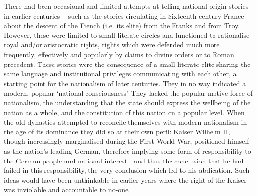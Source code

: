 There had been occasional and limited attempts at telling national origin stories in earlier centuries – such as the stories circulating in Sixteenth century France about the descent of the French (i.e. its elite) from the Franks and from Troy. However, these were limited to small literate circles and functioned to rationalise royal and/or aristocratic rights, rights which were defended much more frequently, effectively and popularly by claims to divine orders or to Roman precedent. These stories were the consequence of a small literate elite sharing the same language and institutional privileges communicating with each other, a starting point for the nationalism of later centuries. They in no way indicated a modern, popular ‘national consciousness’. They lacked the popular motive force of nationalism, the understanding that the state should express the wellbeing of the nation as a whole, and the constitution of this nation on a popular level. When the old dynasties attempted to reconcile themselves with modern nationalism in the age of its dominance they did so at their own peril: Kaiser Wilhelm II, though increasingly marginalised during the First World War, positioned himself as the nation’s leading German, therefore implying some form of responsibility to the German people and national interest - and thus the conclusion that he had failed in this responsibility, the very conclusion which led to his abdication. Such ideas would have been unthinkable in earlier years where the right of the Kaiser was inviolable and accountable to no-one.

